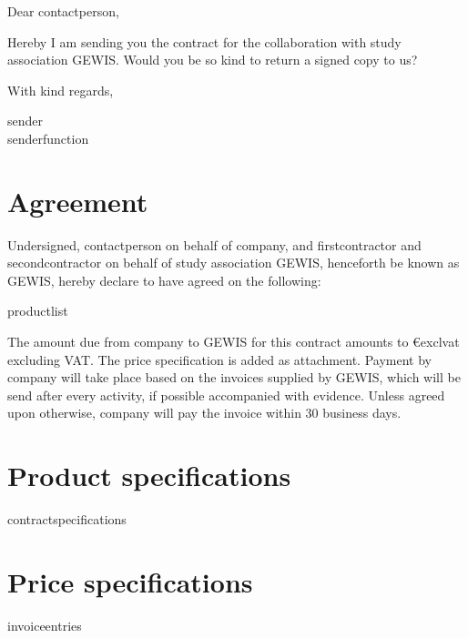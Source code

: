 \documentclass[
printaddress,
]{GEWISLetter}
\begin{document}
	Dear {{{contactperson}}},
	
	Hereby I am sending you the contract for the collaboration with study association GEWIS. Would you be so kind to return a signed copy to us?
	
	With kind regards,	
	
	{{sender}}\\
	{{senderfunction}}
	
	
	\newpage
	\section{Agreement}
	Undersigned, {{contactperson}} on behalf of {{company}}, and {{firstcontractor}} and {{secondcontractor}} on behalf of study association GEWIS, henceforth be known as GEWIS, hereby declare to have agreed on the following:
	\begin{products}
		{{productlist}}
	\end{products}
	
	The amount due from {{company}} to GEWIS for this contract amounts to \euro{{{exclvat}}} excluding VAT. The price specification is added as attachment. Payment by {{company}} will take place based on the invoices supplied by GEWIS, which will be send after every activity, if possible accompanied with evidence. Unless agreed upon otherwise, {{company}} will pay the invoice within 30 business days.
	\vspace{2em}
	
	\signature{{{firstcontractor}}\\{{firstcontractorfunction}}}
	\hfill
	\signature{{{contactperson}}\\{{company}}}

	\signature{{{secondcontractor}}\\{{secondcontractorfunction}}}


	\newpage
	\appendix
	\section{Product specifications}
	\begin{specifications}
		{{contractspecifications}}
	\end{specifications}
	
	\section{Price specifications}
	\begin{invoice}{}
		{{invoiceentries}}
	\end{invoice}
\end{document}
